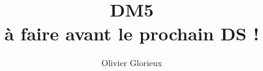 \documentclass[a4paper, 11pt,reqno]{article}
\author{Olivier Glorieux}
\begin{document}
\title{DM5 \\
\small{à faire  avant le prochain DS ! } 
}









%
%
% 
% 
%
%
\end{document}
